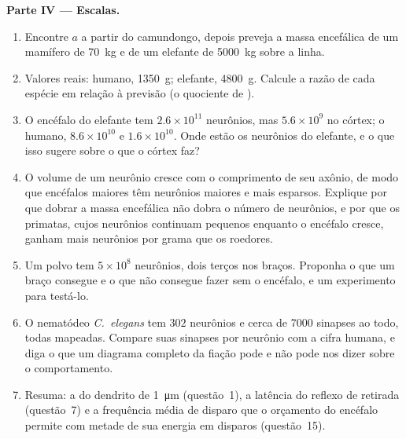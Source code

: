 \begin{problem}
\medskip
\noindent\textbf{Parte IV --- Escalas.}
\begin{enumerate}[resume]
  \item Encontre $a$ a partir do camundongo, depois preveja a massa
        encefálica de um mamífero de \qty{70}{kg} e de um elefante de
        \qty{5000}{kg} sobre a linha.
  \item Valores reais: humano, \qty{1350}{g}; elefante, \qty{4800}{g}.
        Calcule a razão de cada espécie em relação à previsão (o
        quociente de ).
  \item O encéfalo do elefante tem $2.6\times 10^{11}$ neurônios, mas
        $5.6\times 10^{9}$ no córtex; o humano, $8.6\times 10^{10}$ e
        $1.6\times 10^{10}$. Onde estão os neurônios do elefante, e o que
        isso sugere sobre o que o córtex faz?
  \item O volume de um neurônio cresce com o comprimento de seu axônio,
        de modo que encéfalos maiores têm neurônios maiores e mais
        esparsos. Explique por que dobrar a massa encefálica não dobra o
        número de neurônios, e por que os primatas, cujos neurônios
        continuam pequenos enquanto o encéfalo cresce, ganham mais
        neurônios por grama que os roedores.
  \item Um polvo tem $5\times 10^{8}$ neurônios, dois terços nos braços.
        Proponha o que um braço consegue e o que não consegue fazer sem
        o encéfalo, e um experimento para testá-lo.
  \item O nematódeo \emph{C.~elegans} tem $302$ neurônios e cerca de
        \num{7000} sinapses ao todo, todas mapeadas. Compare suas
        sinapses por neurônio com a cifra humana, e diga o que um
        diagrama completo da fiação pode e não pode nos dizer sobre o
        comportamento.
  \item Resuma: a  do dendrito de
        \qty{1}{\micro m} (questão~1), a latência do reflexo de retirada
        (questão~7) e a frequência média de disparo que o orçamento do
        encéfalo permite com metade de sua energia em disparos
        (questão~15).
\end{enumerate}
\end{problem}
